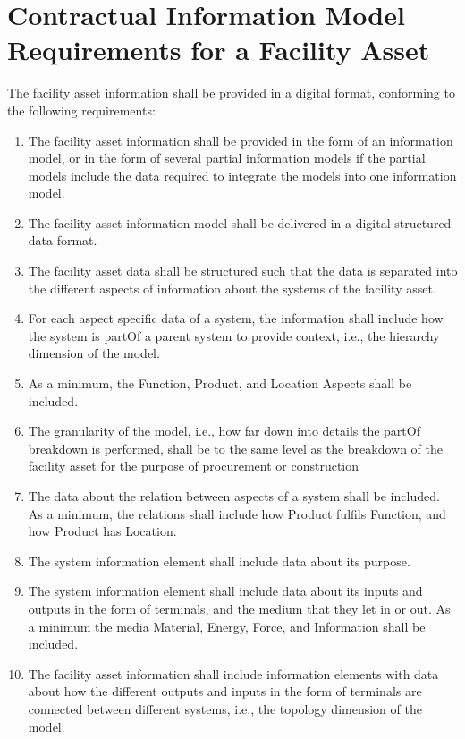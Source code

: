 \documentclass[../main.tex]{subfiles}
\begin{document}
\chapter{Contractual Information Model Requirements for a Facility Asset}
\label{ch:Appendix B}
The facility asset information shall be provided in a digital
format, conforming to the following requirements:

\begin{enumerate}
  \item The facility asset information shall be provided in the form of an information model, or in the form of several
        partial information models if the partial models include the data required to integrate the models into one
        information model.
  \item The facility asset information model shall be delivered in a digital structured data format.
  \item The facility asset data shall be structured such that the data is separated into the different aspects of
        information about the systems of the facility asset.
  \item For each aspect specific data of a system, the information shall include how the system is partOf a
        parent system to provide context, i.e., the hierarchy dimension of the model.
  \item As a minimum, the Function, Product, and Location Aspects shall be included.
  \item The granularity of the model, i.e., how far down into details the partOf breakdown is performed, shall be to the same level as the breakdown of the facility asset for the purpose of procurement or construction
  \item The data about the relation between aspects of a system shall be included. As a minimum, the relations shall
        include how Product fulfils Function, and how Product has Location.
  \item The system information element shall include data about its purpose.
  \item The system information element shall include data about its inputs and outputs in the form of terminals, and the
        medium that they let in or out. As a minimum the media Material, Energy, Force, and Information shall be included.
  \item The facility asset information shall include information elements with data about how the different outputs and
        inputs in the form of terminals are connected between different systems, i.e., the topology dimension of the model.

\end{enumerate}
\end{document}
